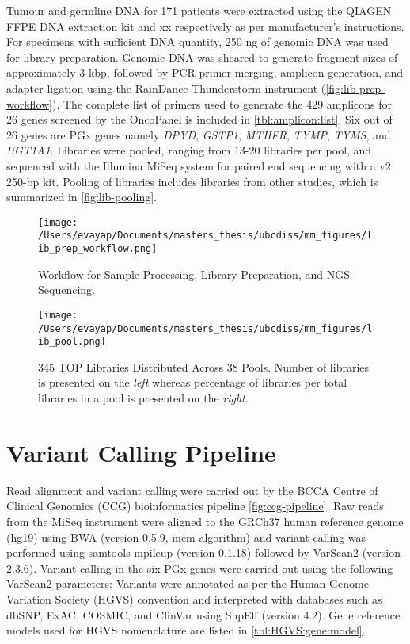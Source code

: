 Tumour and germline DNA for 171 patients were extracted using the QIAGEN FFPE DNA extraction kit and xx respectively as per manufacturer's instructions. For specimens with sufficient DNA quantity, 250 ng of genomic DNA was used for library preparation. Genomic DNA was sheared to generate fragment sizes of approximately 3 kbp, followed by PCR primer merging, amplicon generation, and adapter ligation using the RainDance Thunderstorm instrument (\autoref{fig:lib-prep-workflow}). The complete list of primers used to generate the 429 amplicons for 26 genes screened by the OncoPanel is included in \autoref{tbl:amplicon:list}. Six out of 26 genes are PGx genes namely \textit{DPYD}, \textit{GSTP1}, \textit{MTHFR}, \textit{TYMP}, \textit{TYMS}, and \textit{UGT1A1}. Libraries were pooled, ranging from 13-20 libraries per pool, and sequenced with the Illumina MiSeq system for paired end sequencing with a v2 250-bp kit. Pooling of libraries includes libraries from other studies, which is summarized in \autoref{fig:lib-pooling}.

\begin{figure}
    \centering
    \texttt{[image: /Users/evayap/Documents/masters\_thesis/ubcdiss/mm\_figures/lib\_prep\_workflow.png]}
    \caption{Workflow for Sample Processing, Library Preparation, and NGS Sequencing.}
    \label{fig:lib-prep-workflow}   %
\end{figure}

\begin{figure}
    \centering
    \texttt{[image: /Users/evayap/Documents/masters\_thesis/ubcdiss/mm\_figures/lib\_pool.png]}
    \caption{345 TOP Libraries Distributed Across 38 Pools. Number of libraries is presented on the \textit{left} whereas percentage of libraries per total libraries in a pool is presented on the \textit{right}.}
    \label{fig:lib-pooling}   %
\end{figure}

\section{Variant Calling Pipeline}
\label{sec:VariantCallingPipeline}

Read alignment and variant calling were carried out by the BCCA Centre of Clinical Genomics (CCG) bioinformatics pipeline \autoref{fig:ccg-pipeline}. Raw reads from the MiSeq instrument were aligned to the GRCh37 human reference genome (hg19) using BWA (version 0.5.9, mem algorithm) and variant calling was performed using samtools mpileup (version 0.1.18) followed by VarScan2 (version 2.3.6). Variant calling in the six PGx genes were carried out using the following VarScan2 parameters: Variants were annotated as per the Human Genome Variation Society (HGVS) convention and interpreted with databases such as dbSNP, ExAC, COSMIC, and ClinVar using SnpEff (version 4.2). Gene reference models used for HGVS nomenclature are listed in \autoref{tbl:HGVS:gene:model}.

